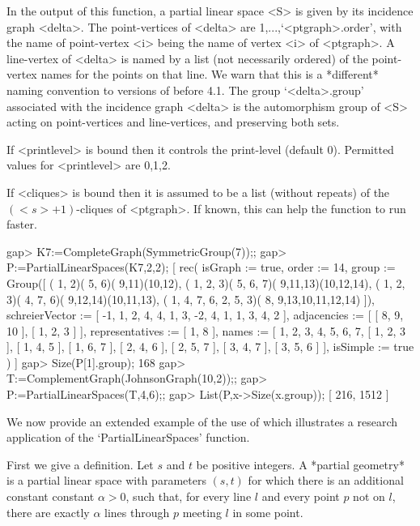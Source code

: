 In the output of this function, a partial linear space <S> is given
by its incidence graph <delta>. The point-vertices of <delta> are
1,...,`<ptgraph>.order', with the name of point-vertex <i> being the
name of vertex <i> of <ptgraph>. A line-vertex of <delta> is named by a
list (not necessarily ordered) of the point-vertex names for the points
on that line.  We warn that this is a *different* naming convention to
versions of {\GRAPE} before 4.1.  The group `<delta>.group' associated
with the incidence graph <delta> is the automorphism group of <S> acting
on point-vertices and line-vertices, and preserving both sets.

If <printlevel> is bound then it controls the print-level (default 0).
Permitted values for <printlevel> are 0,1,2.

If <cliques> is bound then it is assumed to be a list (without repeats)
of the $(<s>+1)$-cliques of <ptgraph>. If known, this can help the
function to run faster.

\beginexample
gap> K7:=CompleteGraph(SymmetricGroup(7));;
gap> P:=PartialLinearSpaces(K7,2,2);
[ rec( isGraph := true, order := 14, 
      group := Group([ ( 1, 2)( 5, 6)( 9,11)(10,12), 
          ( 1, 2, 3)( 5, 6, 7)( 9,11,13)(10,12,14), 
          ( 1, 2, 3)( 4, 7, 6)( 9,12,14)(10,11,13), 
          ( 1, 4, 7, 6, 2, 5, 3)( 8, 9,13,10,11,12,14) ]), 
      schreierVector := [ -1, 1, 2, 4, 4, 1, 3, -2, 4, 1, 1, 3, 4, 2 ], 
      adjacencies := [ [ 8, 9, 10 ], [ 1, 2, 3 ] ], 
      representatives := [ 1, 8 ], 
      names := [ 1, 2, 3, 4, 5, 6, 7, [ 1, 2, 3 ], [ 1, 4, 5 ], [ 1, 6, 7 ], 
          [ 2, 4, 6 ], [ 2, 5, 7 ], [ 3, 4, 7 ], [ 3, 5, 6 ] ], 
      isSimple := true ) ]
gap> Size(P[1].group);
168
gap> T:=ComplementGraph(JohnsonGraph(10,2));;
gap> P:=PartialLinearSpaces(T,4,6);;
gap> List(P,x->Size(x.group));
[ 216, 1512 ]
\endexample


We now provide an extended example of the use of {\GRAPE} which
illustrates a research application of the `PartialLinearSpaces' function.

First we give a definition. Let $s$ and $t$ be positive integers. A
*partial geometry* is a partial linear space with parameters $(s,t)$ for
which there is an additional constant constant $\alpha>0$, such that,
for every line $l$ and every point $p$ not on $l$, there are exactly
$\alpha$ lines through $p$ meeting $l$ in some point. 

